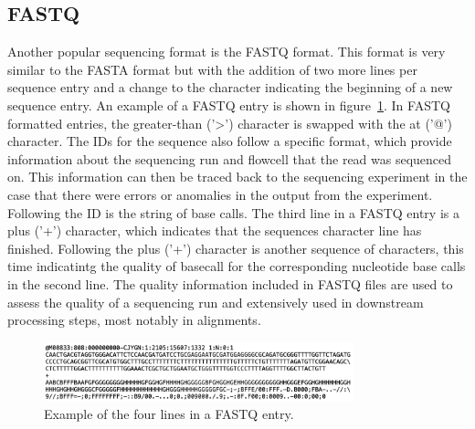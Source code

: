 \subsection{FASTQ}
Another popular sequencing format is the FASTQ format. This format is
very similar to the FASTA format but with the addition of two more
lines per sequence entry and a change to the character indicating the
beginning of a new sequence entry. An example of a FASTQ entry is
shown in figure~\ref{fig:fastq-example}. In FASTQ formatted entries,
the greater-than ('>') character is swapped with the at ('@')
character. The IDs for the sequence also follow a specific format,
which provide information about the sequencing run and flowcell that
the read was sequenced on. This information can then be traced back to
the sequencing experiment in the case that there were errors or
anomalies in the output from the experiment. Following the ID is the
string of base calls. The third line in a FASTQ entry is a plus ('+')
character, which indicates that the sequences character line has
finished. Following the plus ('+') character is another sequence of
characters, this time indicatintg the quality of basecall for the
corresponding nucleotide base calls in the second line. The quality
information included in FASTQ files are used to assess the quality of
a sequencing run and extensively used in downstream processing steps,
most notably in alignments.

\begin{figure}
  \centering
  \includegraphics[width=0.8\textwidth]{figures/fastq-example.png}
  \caption{Example of the four lines in a FASTQ entry.}
  \label{fig:fastq-example}
\end{figure}

